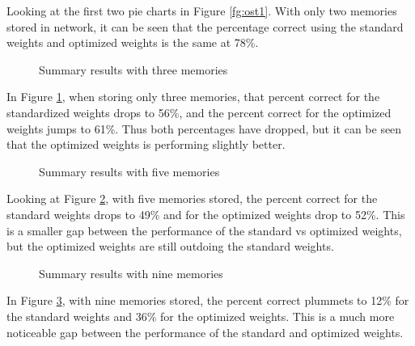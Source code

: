 Looking at the first two pie charts in Figure \ref{fg:ost1}. With only two memories stored in network, it can be seen that the percentage correct using the standard weights and optimized weights is the same at 78\%.\\

\begin{figure}[h]
	\centering
	\caption{Summary results with three memories}
	\label{fg:ost2}
\end{figure}

In Figure \ref{fg:ost2}, when storing only three memories, that percent correct for the standardized weights drops to 56\%, and the percent correct for the optimized weights jumps to 61\%. Thus both percentages have dropped, but it can be seen that the optimized weights is performing slightly better.\\

\begin{figure}[h]
	\centering
	\caption{Summary results with five memories}
	\label{fg:ost3}
\end{figure}

Looking at Figure \ref{fg:ost3}, with five memories stored, the percent correct for the standard weights drops to 49\% and for the optimized weights drop to 52\%. This is a smaller gap between the performance of the standard vs optimized weights, but the optimized weights are still outdoing the standard weights.\\

\begin{figure}[h]
	\centering
	\caption{Summary results with nine memories}
	\label{fg:ost4}
\end{figure}

In Figure \ref{fg:ost4}, with nine memories stored, the percent correct plummets to 12\% for the standard weights and 36\% for the optimized weights. This is a much more noticeable gap between the performance of the standard and optimized weights.\\

